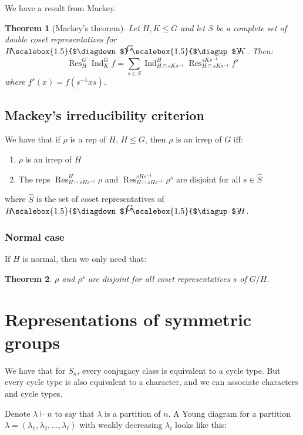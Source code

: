 \documentclass[]{report}
\newtheorem{theorem}{Theorem}
\theoremstyle{definition}
\numberwithin{theorem}{section}
\numberwithin{equation}{section}
\newcommand{\res}{\operatorname{Res}}
\newcommand{\ind}{\operatorname{Ind}}
\newcommand{\doublefaktor}[3]{%
	{\textstyle #1}
	\mkern-4mu\scalebox{1.5}{$\diagdown$}\mkern-5mu^{\textstyle #2}%
	\mkern-4mu\scalebox{1.5}{$\diagup$}\mkern-5mu{\textstyle #3} }
\begin{document}
We have a result from Mackey. 
\begin{theorem}[Mackey's theorem]
	Let $H, K \leq G$ and let $S$ be a complete set of double coset representatives for $\doublefaktor{H}{G}{K}$. Then:
	\begin{equation}
		\res^G_H \ind^G_K f = \sum_{s \in S} \ind^H_{H \cap s K s^{-1}} \res^{s K s^{-1}}_{H \cap s K s^{-1}} f^s
	\end{equation}
	where $f^s(x) = f(s^{-1} x s)$. 
\end{theorem}

\subsection{Mackey's irreducibility criterion}

We have that if $\rho$ is a rep of $H$, $H \leq G$, then $\rho$ is an irrep of $G$ iff:
\begin{enumerate}
	\item $\rho$ is an irrep of $H$
	\item The reps $\res^H_{H \cap s H s^{-1}} \rho$ and $\res^{s H s^{-1}}_{H \cap s H s^{-1}} \rho^s$ are disjoint for all $s \in \widehat{S}$
\end{enumerate}
where $\widehat{S}$ is the set of coset representatives of $\doublefaktor{H}{G}{H}$. 

\subsubsection{Normal case}
If $H$ is normal, then we only need that:
\begin{theorem}
	$\rho$ and $\rho^s$  are disjoint for all coset representatives $s$ of $G/H$. 
\end{theorem}



\section{Representations of symmetric groups}

We have that for $S_n$, every conjugacy class is equivalent to a cycle type. But every cycle type is also equivalent to a character, and we can associate characters and cycle types.

Denote $\lambda \vdash n$ to say that $\lambda$ is a partition of $n$. 
A Young diagram for a partition $\lambda = (\lambda_1, \lambda_2, ..., \lambda_\ell)$ with weakly decreasing $\lambda_i$ looks like this:
\end{document}
